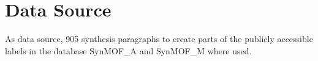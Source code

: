 






\section{Data Source}\label{sec:data}
As data source, 905 synthesis paragraphs to create parts of the publicly accessible labels in the database SynMOF\_A and SynMOF\_M \cite{luo_mof_2022} where used.

